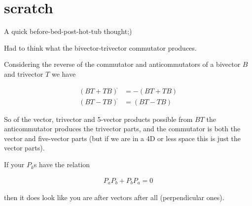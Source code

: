 

\chapter{scratch}
\beginArtNoToc

A quick before-bed-post-hot-tub thought;)

Had to think what the bivector-trivector commutator produces.

Considering the reverse of the commutator and anticommutators of a bivector $B$ and trivector $T$ we have

\begin{align*}
(B T + T B)^{\tilde{}} &= -(B T + T B) \\
(B T - T B)^{\tilde{}} &= (B T - T B)
\end{align*}

So of the vector, trivector and 5-vector products possible from $BT$ the anticommutator produces the trivector parts, and the commutator is both the vector and five-vector parts (but if we are in a 4D or less space this is just the vector parts).

If your $P_k$s have the relation

\begin{align*}
P_a P_b + P_b P_a = 0
\end{align*}

then it does look like you are after vectors after all (perpendicular ones).  

\EndNoBibArticle

